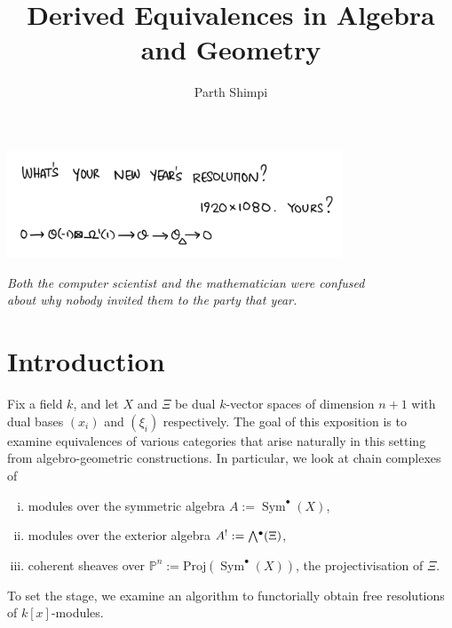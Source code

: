 \documentclass[a4paper]{article}
\title{Derived Equivalences in Algebra and Geometry}
\author{Parth Shimpi}
\date{Easter 2022 \\ \vspace{2em}\small{Essay submitted in partial fulfillment of the requirements for \\ Master of
Mathematics degree at the University of Cambridge. \\ 
\vspace{3em}\hrule}}
\theoremstyle{definition}
\theoremstyle{remark}
\newcommand{\Exter}{\mathchoice{{\textstyle\bigwedge}}%
    {{\bigwedge}}%
    {{\textstyle\wedge}}%
    {{\scriptstyle\wedge}}}
\DeclareMathOperator{\Sym}{\text{Sym}}
\DeclareMathOperator{\exterior}{\Exter^\bullet}
\newcommand{\Proj}{\ensuremath{\text{Proj}}}
\newcommand{\Pn}{\ensuremath{{\mathbb{P}^n}}}
\begin{document}
 


\maketitle
\begin{center}
    \includegraphics[width=10cm]{head-art.png}
    
    \textit{Both the computer scientist and the mathematician were confused
    \\about why nobody invited them to the party that year.}
\end{center}
\vspace{5em}

\tableofcontents 
\pagebreak

\section*{Introduction}

Fix a field \(k\), and let \(X\) and \(\Xi\) be dual \(k\)-vector spaces of
dimension \(n+1\) with dual bases \((x_i)\) and \((\xi_i)\) respectively. The goal
of this exposition is to examine equivalences of various categories that arise
naturally in this setting from algebro-geometric constructions. In particular,
we look at chain complexes of 
\begin{enumerate}[(i)]
    \item modules over the symmetric algebra \(A:=
        \Sym^\bullet(X)\),
    \item modules over the exterior algebra \(A^!:= \exterior(\Xi)\),
    \item coherent sheaves over \(\Pn := \Proj(\Sym^\bullet (X))\), the
        projectivisation of \(\Xi\).
\end{enumerate}

To set the stage, we examine an algorithm to functorially obtain free
resolutions of \(k[x]\)-modules.
\end{document}
